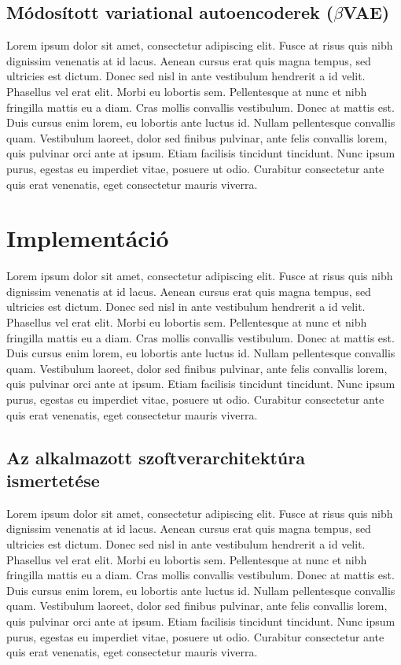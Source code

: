 \documentclass[12pt]{article}
\begin{document}
\subsection{Módosított variational autoencoderek ($\beta$VAE)}

Lorem ipsum dolor sit amet, consectetur adipiscing elit. Fusce at risus quis nibh dignissim venenatis at id lacus. Aenean cursus erat quis magna tempus, sed ultricies est dictum. Donec sed nisl in ante vestibulum hendrerit a id velit. Phasellus vel erat elit. Morbi eu lobortis sem. Pellentesque at nunc et nibh fringilla mattis eu a diam. Cras mollis convallis vestibulum. Donec at mattis est. Duis cursus enim lorem, eu lobortis ante luctus id. Nullam pellentesque convallis quam. Vestibulum laoreet, dolor sed finibus pulvinar, ante felis convallis lorem, quis pulvinar orci ante at ipsum. Etiam facilisis tincidunt tincidunt. Nunc ipsum purus, egestas eu imperdiet vitae, posuere ut odio. Curabitur consectetur ante quis erat venenatis, eget consectetur mauris viverra.

\section{Implementáció}

Lorem ipsum dolor sit amet, consectetur adipiscing elit. Fusce at risus quis nibh dignissim venenatis at id lacus. Aenean cursus erat quis magna tempus, sed ultricies est dictum. Donec sed nisl in ante vestibulum hendrerit a id velit. Phasellus vel erat elit. Morbi eu lobortis sem. Pellentesque at nunc et nibh fringilla mattis eu a diam. Cras mollis convallis vestibulum. Donec at mattis est. Duis cursus enim lorem, eu lobortis ante luctus id. Nullam pellentesque convallis quam. Vestibulum laoreet, dolor sed finibus pulvinar, ante felis convallis lorem, quis pulvinar orci ante at ipsum. Etiam facilisis tincidunt tincidunt. Nunc ipsum purus, egestas eu imperdiet vitae, posuere ut odio. Curabitur consectetur ante quis erat venenatis, eget consectetur mauris viverra.

\subsection{Az alkalmazott szoftverarchitektúra ismertetése}

Lorem ipsum dolor sit amet, consectetur adipiscing elit. Fusce at risus quis nibh dignissim venenatis at id lacus. Aenean cursus erat quis magna tempus, sed ultricies est dictum. Donec sed nisl in ante vestibulum hendrerit a id velit. Phasellus vel erat elit. Morbi eu lobortis sem. Pellentesque at nunc et nibh fringilla mattis eu a diam. Cras mollis convallis vestibulum. Donec at mattis est. Duis cursus enim lorem, eu lobortis ante luctus id. Nullam pellentesque convallis quam. Vestibulum laoreet, dolor sed finibus pulvinar, ante felis convallis lorem, quis pulvinar orci ante at ipsum. Etiam facilisis tincidunt tincidunt. Nunc ipsum purus, egestas eu imperdiet vitae, posuere ut odio. Curabitur consectetur ante quis erat venenatis, eget consectetur mauris viverra.
\end{document}
